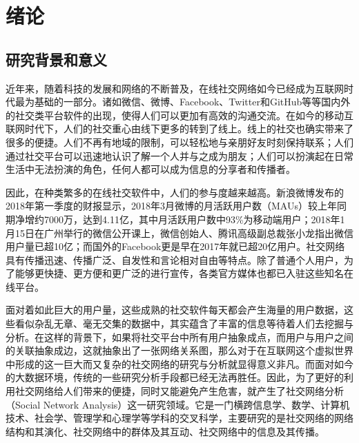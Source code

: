 \chapter{绪论}

\section{研究背景和意义}%
近年来，随着科技的发展和网络的不断普及，在线社交网络如今已经成为互联网时代最为基础的一部分。诸如微信、微博、Facebook、Twitter和GitHub等等国内外的社交类平台软件的出现，使得人们可以更加有高效的沟通交流。在如今的移动互联网时代下，人们的社交重心由线下更多的转到了线上。线上的社交也确实带来了很多的便捷。人们不再有地域的限制，可以轻松地与亲朋好友时刻保持联系；人们通过社交平台可以迅速地认识了解一个人并与之成为朋友；人们可以扮演起在日常生活中无法扮演的角色，任何人都可以成为信息的分享者和传播者。

因此，在种类繁多的在线社交软件中，人们的参与度越来越高。新浪微博发布的2018年第一季度的财报显示，2018年3月微博的月活跃用户数（MAUs）较上年同期净增约7000万，达到4.11亿，其中月活跃用户数中93\%为移动端用户；2018年1月15日在广州举行的微信公开课上，微信创始人、腾讯高级副总裁张小龙指出微信用户量已超10亿；而国外的Facebook更是早在2017年就已超20亿用户。社交网络具有传播迅速、传播广泛、自发性和言论相对自由等特点。除了普通个人用户，为了能够更快捷、更方便和更广泛的进行宣传，各类官方媒体也都已入驻这些知名在线平台。

面对着如此巨大的用户量，这些成熟的社交软件每天都会产生海量的用户数据，这些看似杂乱无章、毫无交集的数据中，其实蕴含了丰富的信息等待着人们去挖掘与分析。在这样的背景下，如果将社交平台中所有用户抽象成点，而用户与用户之间的关联抽象成边，这就抽象出了一张网络关系图，那么对于在互联网这个虚拟世界中形成的这一巨大而又复杂的社交网络的研究与分析就显得意义非凡。而面对如今的大数据环境，传统的一些研究分析手段都已经无法再胜任。因此，为了更好的利用社交网络给人们带来的便捷，同时又能避免产生危害，就产生了社交网络分析（Social Network Analysis）这一研究领域。它是一门横跨信息学、数学、计算机技术、社会学、管理学和心理学等学科的交叉科学，主要研究的是社交网络的网络结构和其演化、社交网络中的群体及其互动、社交网络中的信息及其传播。

